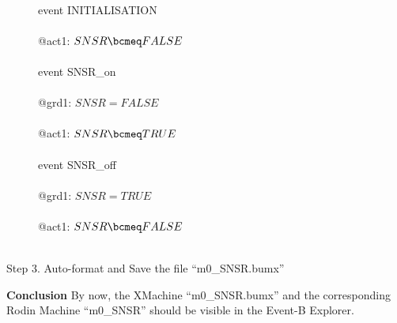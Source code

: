 \begin{description}
\begin{center}
\begin{Bcode}
		\Bevents\\
		\Btab event INITIALISATION\\
		\Btab \Bthen\\
		\Btab \Btab @act1: \(SNSR \bcmeq FALSE\)\\
		\Btab \Bend\\
		\Btab event SNSR_on\\
		\Btab \Bwhere\\
		\Btab \Btab @grd1: \(SNSR = FALSE\)\\
		\Btab \Bthen\\
		\Btab \Btab @act1: \(SNSR \bcmeq TRUE\)\\
		\Btab \Bend\\
		\Btab event SNSR_off\\
		\Btab \Bwhere\\
		\Btab \Btab @grd1: \(SNSR = TRUE\)\\
		\Btab \Bthen\\
		\Btab \Btab @act1: \(SNSR \bcmeq FALSE\)\\
		\Btab \Bend\\
		\Bend
		\endif
	\end{Bcode}
\end{center}

\item[Step 3. Auto-format and Save the file ``m0\_SNSR.bumx''] 
\end{description}

\textbf{Conclusion} By now, the XMachine ``m0\_SNSR.bumx'' and the corresponding Rodin Machine ``m0\_SNSR'' should be visible in the Event-B Explorer.

